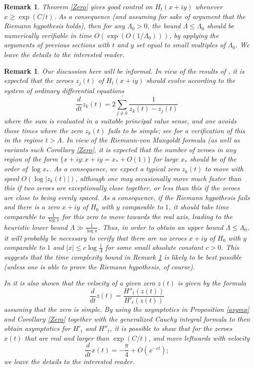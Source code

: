 \documentclass[a4paper,11pt,twoside]{amsart}
\newtheorem{remark}[theorem]{Remark}
\begin{document}
\begin{remark}\label{time-complexity}  Theorem \ref{Zero} gives good control on $H_t(x+iy)$ whenever $x \geq \exp( C/t )$.  As a consequence (and assuming for sake of argument that the Riemann hypothesis holds), then for any $\Lambda_0 > 0$, the bound $\Lambda \leq \Lambda_0$ should be numerically verifiable in time $O( \exp( O(1/\Lambda_0) ))$, by applying the arguments of previous sections with $t$ and $y$ set equal to small multiples of $\Lambda_0$.  We leave the details to the interested reader.
\end{remark}

\begin{remark} Our discussion here will be informal.  In view of the results of \cite{csv}, it is expected that the zeroes $z_j(t)$ of $H_t(x+iy)$ should evolve according to the system of ordinary differential equations
$$ \frac{d}{dt} z_k(t) = 2 \sum_{j \neq k}^{\prime} \frac{1}{z_k(t) - z_j(t)}$$
where the sum is evaluated in a suitable principal value sense, and one avoids those times where the zero $z_k(t)$ fails to be simple; see \cite[Lemma 2.4]{csv} for a verification of this in the regime $t > \Lambda$.  In view of the Riemann-von Mangoldt formula (as well as variants such Corollary \ref{Zero}, it is expected that the number of zeroes in any region of the form $\{ x+iy: x+iy = x_* + O(1) \}$ for large $x_*$ should be of the order of $\log x_*$.  As a consequence, we expect a typical zero $z_k(t)$ to move with speed $O( \log |z_k(t)| )$, although one may occasionally move much faster than this if two zeroes are exceptionally close together, or less than this if the zeroes are close to being evenly spaced.  As a consequence, if the Riemann hypothesis fails and there is a zero $x+iy$ of $H_0$ with $y$ comparable to $1$, it should take time comparable to $\frac{1}{\log x}$ for this zero to move towards the real axis, leading to the heuristic lower bound $\Lambda \gg \frac{1}{\log x}$.  Thus, in order to obtain an upper bound $\Lambda \leq \Lambda_0$, it will probably be necessary to verify that there are no zeroes $x+iy$ of $H_0$ with $y$ comparable to $1$ and $|x| \leq c \log \frac{1}{\Lambda}$ for some small absolute constant $c>0$.  This suggests that the time complexity bound in Remark \ref{time-complexity} is likely to be best possible (unless one is able to prove the Riemann hypothesis, of course).

In \cite[Lemma 2.1]{csv} it is also shown that the velocity of a given zero $z(t)$ is given by the formula
$$ \frac{d}{dt} z(t) = \frac{H''_t(z(t))}{H'_t(z(t))}$$
assuming that the zero is simple.  By using the asymptotics in Proposition \ref{asymp} and Corollary \ref{Zero} together with the generalized Cauchy integral formula to then obtain asymptotics for $H'_t$ and $H''_t$, it is possible to show that for the zeroes $x(t)$ that are real and larger than $\exp(C/t)$, and move leftwards with velocity
$$ \frac{d}{dt} x(t) = - \frac{\pi}{4} + O( x^{-ct} );$$
we leave the details to the interested reader.  


\end{remark}
\end{document}
